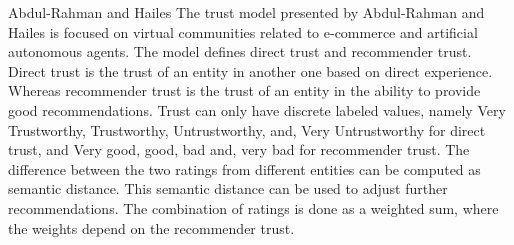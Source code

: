 %			




Abdul-Rahman and Hailes The trust model presented by Abdul-Rahman and Hailes \cite{abdul-rahman_supporting_2000} 
	is focused on virtual communities related to e-commerce and artificial autonomous agents.
The model defines direct trust and recommender trust.
Direct trust is the trust of an entity in another one based on direct experience.
Whereas recommender trust is the trust of an entity in the ability to provide good recommendations.
Trust can only have discrete labeled values,
	namely Very Trustworthy,
	Trustworthy,
	Untrustworthy,
	and,
	Very Untrustworthy for direct trust,
	and Very good,
	good,
	bad and,
	very bad for recommender trust.
The difference between the two ratings from different entities can be computed as semantic distance.
This semantic distance can be used to adjust further recommendations.
The combination of ratings is done as a weighted sum,
	where the weights depend on the recommender trust.


